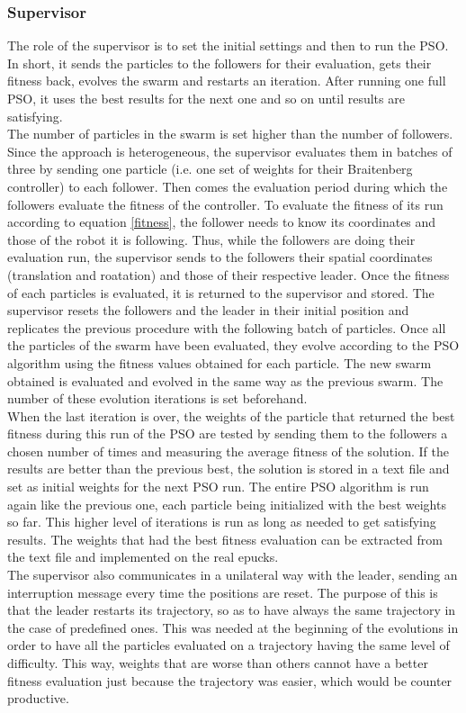 \documentclass[a4, 10 pt, conference]{ieeeconf}  %
\begin{document}
\subsubsection{Supervisor}
The role of the supervisor is to set the initial settings and then to run the PSO. In short, it sends the particles to the followers for their evaluation, gets their fitness back, evolves the swarm and restarts an iteration. After running one full PSO, it uses the best results for the next one and so on until results are satisfying.\\
The number of particles in the swarm is set higher than the number of followers. Since the approach is heterogeneous, the supervisor evaluates them in batches of three by sending one particle (i.e. one set of weights for their Braitenberg controller) to each follower. Then comes the evaluation period during which the followers evaluate the fitness of the controller. To evaluate the fitness of its run according to equation \ref{fitness}, the follower needs to know its coordinates and those of the robot it is following. Thus, while the followers are doing their evaluation run, the supervisor sends to the followers their spatial coordinates (translation and roatation) and those of their respective leader. Once the fitness of each particles is evaluated, it is returned to the supervisor and stored. The supervisor resets the followers and the leader in their initial position and replicates the previous procedure with the following batch of particles. Once all the particles of the swarm have been evaluated, they evolve according to the PSO algorithm using the fitness values obtained for each particle. The new swarm obtained is evaluated  and evolved in the same way as the previous swarm. The number of these evolution iterations is set beforehand.\\
When the last iteration is over, the weights of the particle that returned the best fitness during this run of the PSO are tested by sending them to the followers a chosen number of times and measuring the average fitness of the solution. If the results are better than the previous best, the solution is stored in a text file and set as initial weights for the next PSO run. The entire PSO algorithm is run again like the previous one, each particle being initialized with the best weights so far. This higher level of iterations is run as long as needed to get satisfying results. The weights that had the best fitness evaluation can be extracted from the text file and implemented on the real epucks.\\
The supervisor also communicates in a unilateral way with the leader, sending an interruption message every time the positions are reset. The purpose of this is that the leader restarts its trajectory, so as to have always the same trajectory in the case of predefined ones. This was needed at the beginning of the evolutions in order to have all the particles evaluated on a trajectory having the same level of difficulty. This way, weights that are worse than others cannot have a better fitness evaluation just because the trajectory was easier, which would be counter productive.
\end{document}
